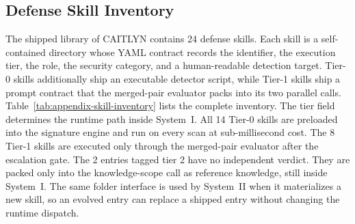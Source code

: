 \subsection{Defense Skill Inventory}
\label{app:skill-inventory}



The shipped library of CAITLYN contains 24 defense skills.
Each skill is a self-contained directory whose YAML contract records the
identifier, the execution tier, the role, the security category, and a
human-readable detection target.
Tier-0 skills additionally ship an executable detector script, while Tier-1
skills ship a prompt contract that the merged-pair evaluator packs into its
two parallel calls.
Table~\ref{tab:appendix-skill-inventory} lists the complete inventory.
The tier field determines the runtime path inside System~I.
All 14 Tier-0 skills are preloaded into the signature engine and run on
every scan at sub-millisecond cost.
The 8 Tier-1 skills are executed only through the merged-pair evaluator
after the escalation gate. The 2 entries tagged tier 2 have no
independent verdict. They are packed only into the knowledge-scope call
as reference knowledge, still inside System~I.
The same folder interface is used by System~II when it materializes a new
skill, so an evolved entry can replace a shipped entry without changing the
runtime dispatch.

